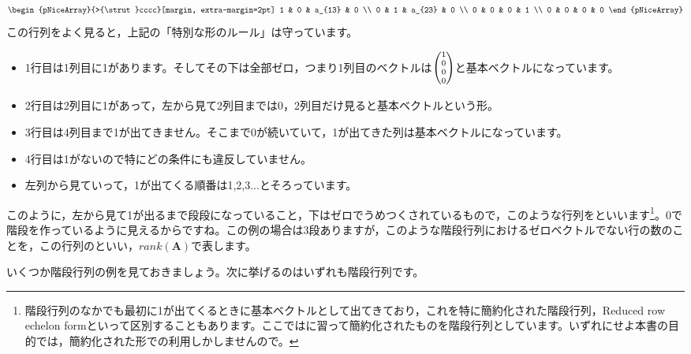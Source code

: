 \documentclass{ltjsbook}
\begin{document}
\[
	\begin{pNiceArray}{>{\strut}cccc}[margin, extra-margin=2pt]
		1 & 0 & a_{13} & 0 \\
		0 & 1 & a_{23} & 0 \\
		0 & 0 & 0 & 1 \\
		0 & 0 & 0 & 0
	\end{pNiceArray}
\]
この行列をよく見ると，上記の「特別な形のルール」は守っています。
\begin{itemize}
	\item 1行目は1列目に1があります。そしてその下は全部ゼロ，つまり1列目のベクトルは$\scriptsize\begin{pmatrix}1 \\ 0 \\ 0\\ 0 \end{pmatrix}$と基本ベクトルになっています。
	\item 2行目は2列目に1があって，左から見て2列目までは0，2列目だけ見ると基本ベクトルという形。
	\item 3行目は4列目まで1が出てきません。そこまで0が続いていて，1が出てきた列は基本ベクトルになっています。
	\item 4行目は1がないので特にどの条件にも違反していません。
	\item 左列から見ていって，1が出てくる順番は1,2,3...とそろっています。
\end{itemize}

このように，左から見て1が出るまで段段になっていること，下はゼロでうめつくされているもので，このような行列をといいます\footnote{階段行列のなかでも最初に1が出てくるときに基本ベクトルとして出てきており，これを特に簡約化された階段行列，Reduced row echelon formといって区別することもあります。ここでは\textcite{Murakami20160301}に習って簡約化されたものを階段行列としています。いずれにせよ本書の目的では，簡約化された形での利用しかしませんので。}。0で階段を作っているように見えるからですね。この例の場合は3段ありますが，このような階段行列におけるゼロベクトルでない行の数のことを，この行列のといい，$rank(\bm{A})$で表します。

いくつか階段行列の例を見ておきましょう。次に挙げるのはいずれも階段行列です。
\end{document}
